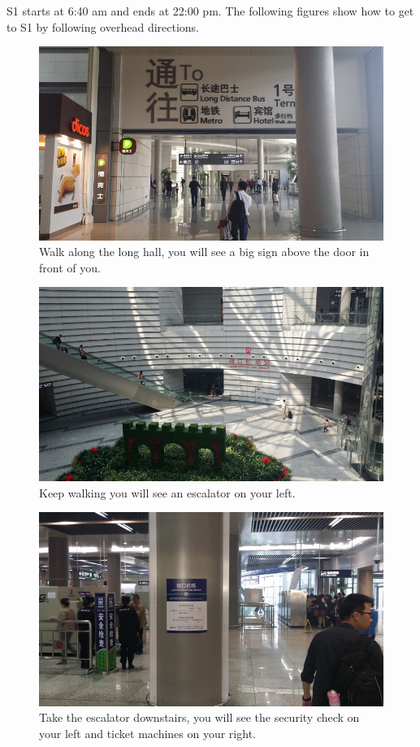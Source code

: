 \documentclass[11pt]{article}
\begin{document}
S1 starts at 6:40 am and ends at 22:00 pm.
The following figures show how to get to S1 by following overhead directions.
\begin{figure}[!h]
    \centering
    	\includegraphics[scale=0.27]{20150331_105936.jpg}
    	\caption{Walk along the long hall, you will see a big sign above the door in front of you.\label{20150331_105936}}
 \end{figure}
\begin{figure}[!h]
    \centering
    	\includegraphics[scale=0.27]{20150331_110112.jpg}
    	\caption{Keep walking you will see an escalator on your left.\label{20150331_110112}}
 \end{figure}
 \begin{figure}[!h]
    \centering
    	\includegraphics[scale=0.27]{20150331_110303.jpg}
    	\caption{Take the escalator downstairs, you will see the security check on your left and ticket machines on your right.\label{20150331_110303}}
 \end{figure}
\end{document}
